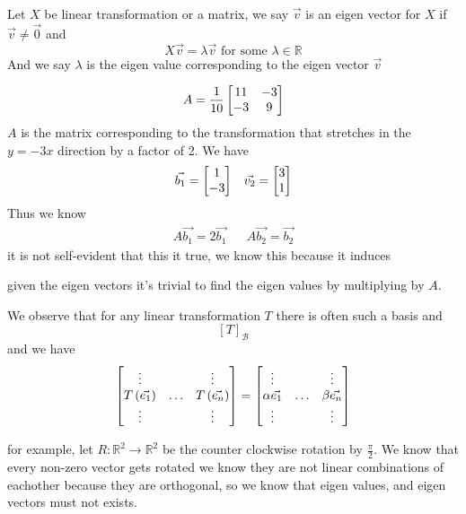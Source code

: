 \documentclass[11pt]{book}
\begin{document}
\begin{defn}\label{defn:eigen_vector}
    Let $X$ be linear transformation or a matrix, we say $\vec{v} $ is an eigen vector for $X$  if $\vec{v} \neq \vec{0} $ and
    \[
    \boxed{X\vec{v} = \lambda \vec{v} }\text{ for some  } \lambda \in \mathbb{R} 
    \]
    And we say $\lambda $ is the eigen value corresponding to the eigen vector $\vec{v} $   
\end{defn}

\begin{eg}
    \[
    A= \frac{1}{10}\mat[b]{ 11 & -3 \\ -3 & 9 }
    \]
    $A$ is the matrix corresponding to the transformation that stretches in the $y= -3x$ direction by a factor of 2. We have 
    \begin{align*}
        \vec{b_1} = \mat{ 1 \\ -3 }  && \vec{v_2} = \mat{ 3 \\ 1 } 
    \end{align*}
    Thus we know 
    \begin{align*}
        A\vec{b_1} = 2\vec{b_1}  && A\vec{b_2} = \vec{b_2} 
    \end{align*}
    it is not self-evident that this it true, we know this because it induces
\end{eg}

\begin{remark}
    given the eigen vectors it's trivial to find the eigen values by multiplying by $A$.
\end{remark}

\begin{remark}
    We observe that for any linear transformation $T$ there is often such a basis and 
    \[
    \left[ T \right]_{\mathcal{B}} 
    \]
    and we have 
    \[
    \mat[b]{ \vdots  &  & \vdots  \\ T\left(\vec{e_1} \right)  & \ldots  & T\left(\vec{e_{n} } \right)  \\ \vdots  &  & \vdots  }= \mat[b]{ \vdots  &  & \vdots  \\ \alpha \vec{e_1}  & \ldots  & \beta \vec{e_{n} }  \\ \vdots  &  & \vdots  }
    \]
\end{remark}
\begin{eg}
    for example, let $R : \mathbb{R} ^2  \to \mathbb{R} ^2  $ be the counter clockwise rotation by $\frac{\pi }{2}$. We know that every non-zero vector gets rotated we know they are not linear combinations of eachother because they are orthogonal, so we know that eigen values, and eigen vectors must not exists. 
\end{eg}
\end{document}
